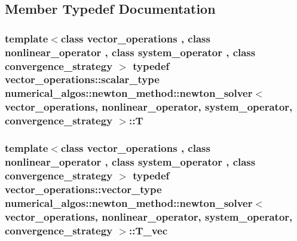 \subsection{Member Typedef Documentation}
\hypertarget{classnumerical__algos_1_1newton__method_1_1newton__solver_ad3e4bf5e0eec7f6f103f27378d8b9be7}{
\subsubsection[{T}]{\setlength{\rightskip}{0pt plus 5cm}template$<$class vector\-\_\-operations , class nonlinear\-\_\-operator , class system\-\_\-operator , class convergence\-\_\-strategy $>$ typedef {\bf vector\-\_\-operations\-::scalar\-\_\-type} {\bf numerical\-\_\-algos\-::newton\-\_\-method\-::newton\-\_\-solver}$<$ {\bf vector\-\_\-operations}, nonlinear\-\_\-operator, {\bf system\-\_\-operator}, convergence\-\_\-strategy $>$\-::{\bf T}}}\label{classnumerical__algos_1_1newton__method_1_1newton__solver_ad3e4bf5e0eec7f6f103f27378d8b9be7}
\hypertarget{classnumerical__algos_1_1newton__method_1_1newton__solver_afc800f3277daaae0e778d366f857b43f}{
\subsubsection[{T\-\_\-vec}]{\setlength{\rightskip}{0pt plus 5cm}template$<$class vector\-\_\-operations , class nonlinear\-\_\-operator , class system\-\_\-operator , class convergence\-\_\-strategy $>$ typedef {\bf vector\-\_\-operations\-::vector\-\_\-type} {\bf numerical\-\_\-algos\-::newton\-\_\-method\-::newton\-\_\-solver}$<$ {\bf vector\-\_\-operations}, nonlinear\-\_\-operator, {\bf system\-\_\-operator}, convergence\-\_\-strategy $>$\-::{\bf T\-\_\-vec}}}\label{classnumerical__algos_1_1newton__method_1_1newton__solver_afc800f3277daaae0e778d366f857b43f}


